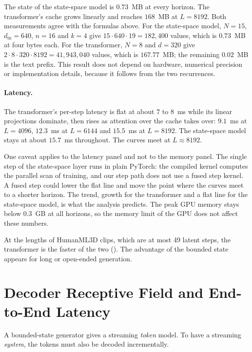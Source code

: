 The state of the state-space model is $0.73$~MB at every horizon. The transformer's cache grows linearly and reaches $168$~MB at $L = 8192$. Both measurements agree with the formulas above. For the state-space model, $N = 15$, $d_{\mathrm{in}} = 640$, $n = 16$ and $k = 4$ give $15 \cdot 640 \cdot 19 = 182{,}400$ values, which is $0.73$~MB at four bytes each. For the transformer, $N = 8$ and $d = 320$ give $2 \cdot 8 \cdot 320 \cdot 8192 = 41{,}943{,}040$ values, which is $167.77$~MB; the remaining $0.02$~MB is the text prefix. This result does not depend on hardware, numerical precision or implementation details, because it follows from the two recurrences.

\paragraph{Latency.} The transformer's per-step latency is flat at about $7$ to $8$~ms while its linear projections dominate, then rises as attention over the cache takes over: $9.1$~ms at $L = 4096$, $12.3$~ms at $L = 6144$ and $15.5$~ms at $L = 8192$. The state-space model stays at about $15.7$~ms throughout. The curves meet at $L \approx 8192$.

One caveat applies to the latency panel and not to the memory panel. The single step of the state-space layer runs in plain PyTorch: the compiled kernel computes the parallel scan of training, and our step path does not use a fused step kernel. A fused step could lower the flat line and move the point where the curves meet to a shorter horizon. The trend, growth for the transformer and a flat line for the state-space model, is what the analysis predicts. The peak GPU memory stays below $0.3$~GB at all horizons, so the memory limit of the GPU does not affect these numbers.

At the lengths of HumanML3D clips, which are at most 49 latent steps, the transformer is the faster of the two (). The advantage of the bounded state appears for long or open-ended generation.

\section{Decoder Receptive Field and End-to-End Latency}
\label{sec:stream_decoder}

A bounded-state generator gives a streaming \emph{token} model. To have a streaming \emph{system}, the tokens must also be decoded incrementally.


